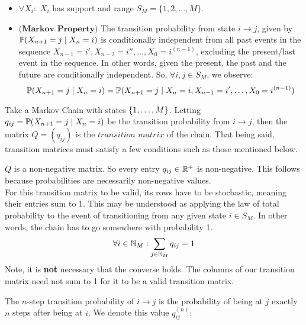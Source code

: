 \begin{itemize}
\item $\forall X_i:$ $X_i$ has support and range $S_M = \{1,2,...,M\}$.
\item $\textbf{(Markov Property)}$ The transition probability from state $i \to j$, given by $\Prb(X_{n+1} = j \mid X_n = i)$ is conditionally independent from all past events in the sequence $X_{n-1} = i',X_{n-2} = i'', \dots,X_0 = i^{(n-1)}$, excluding the present/last event in the sequence. In other words, given the present, the past and the future are conditionally independent. So, $\forall i,j \in S_M$, we observe:
$$ \Prb(X_{n+1} = j \mid X_n = i) = \Prb(X_{n+1} = j \mid X_n = i, X_{n-1} = i', \dots,X_0 = i^{(n-1)})$$
\end{itemize}

\newpage
{}

\begin{definition}
Take a Markov Chain with states $\{\oneto[M]\}$.
Letting $q_{ij} = \P(X_{n+1} = j \mid X_n = i)$ be the transition probability from $i \to j$, then the matrix $Q=(q_{ij})$ is the $\textit{transition matrix}$ of the chain.
That being said, transition matrices must satisfy a few conditions such as those mentioned below.
\end{definition}



 $Q$ is a non-negative matrix. So every entry $q_{ij} \in \R^+$ is non-negative.
This follows because probabilities are necessarily non-negative values. \\

 For this transition matrix to be valid, its rows have to be stochastic, meaning their entries sum to 1. This may be understood as applying the law of total probability to the event of transitioning from any given state $i \in S_M$. In other words, the chain has to go somewhere with probability 1.
$$\forall i \in \N_M: \sum_{j \in \N_M} q_{ij} = 1$$
Note, it is \textbf{not} necessary that the converse holds. The columns of our transition matrix need not sum to 1 for it to be a valid transition matrix.


\begin{definition} The $n$-step transition probability of $i \to j$ is the probability of being at $j$ exactly $n$ steps after being at $i$. We denote this value $q_{ij}^{(n)}:$
\end{definition}

